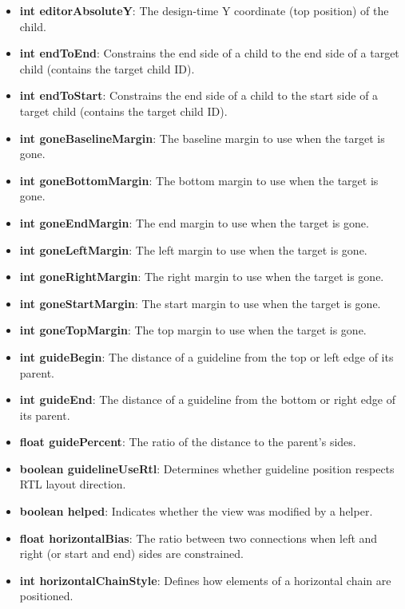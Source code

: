 \documentclass{report}
\begin{document}
\begin{itemize}
\begin{itemize}
                \item \textbf{int editorAbsoluteY}: The design-time Y coordinate (top position) of the child.
                \item \textbf{int endToEnd}: Constrains the end side of a child to the end side of a target child (contains the target child ID).
                \item \textbf{int endToStart}: Constrains the end side of a child to the start side of a target child (contains the target child ID).
                \item \textbf{int goneBaselineMargin}: The baseline margin to use when the target is gone.
                \item \textbf{int goneBottomMargin}: The bottom margin to use when the target is gone.
                \item \textbf{int goneEndMargin}: The end margin to use when the target is gone.
                \item \textbf{int goneLeftMargin}: The left margin to use when the target is gone.
                \item \textbf{int goneRightMargin}: The right margin to use when the target is gone.
                \item \textbf{int goneStartMargin}: The start margin to use when the target is gone.
                \item \textbf{int goneTopMargin}: The top margin to use when the target is gone.
                \item \textbf{int guideBegin}: The distance of a guideline from the top or left edge of its parent.
                \item \textbf{int guideEnd}: The distance of a guideline from the bottom or right edge of its parent.
                \item \textbf{float guidePercent}: The ratio of the distance to the parent's sides.
                \item \textbf{boolean guidelineUseRtl}: Determines whether guideline position respects RTL layout direction.
                \item \textbf{boolean helped}: Indicates whether the view was modified by a helper.
                \item \textbf{float horizontalBias}: The ratio between two connections when left and right (or start and end) sides are constrained.
                \item \textbf{int horizontalChainStyle}: Defines how elements of a horizontal chain are positioned.

\end{itemize}
\end{itemize}
\end{document}
